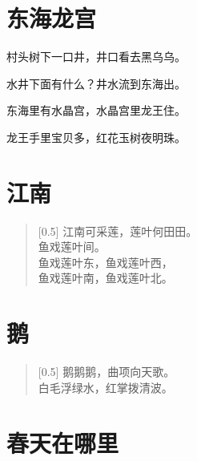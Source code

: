 \documentclass[12pt,UTF-8,openany]{ctexbook}
\begin{document}
\chapter{东海龙宫}

\begin{large}
    
    村头树下一口井，井口看去黑乌乌。
    
    水井下面有什么？井水流到东海出。
    
    东海里有水晶宫，水晶宫里龙王住。
    
    龙王手里宝贝多，红花玉树夜明珠。
    
\end{large}





\chapter{江南}

\begin{large}
    
    \begin{verse}[0.5\linewidth]
        江南可采莲，莲叶何田田。 \\
        鱼戏莲叶间。 \\
        鱼戏莲叶东，鱼戏莲叶西， \\
        鱼戏莲叶南，鱼戏莲叶北。
    \end{verse}
    
\end{large}





\chapter{鹅}

\begin{large}
    
    \begin{verse}[0.5\linewidth]
        \phantom{鹅}鹅鹅鹅\phantom{鹅}，曲项向天歌。 \\
        白毛浮绿水，红掌拨清波。
    \end{verse}
    
\end{large}





\chapter{春天在哪里}
\end{document}
